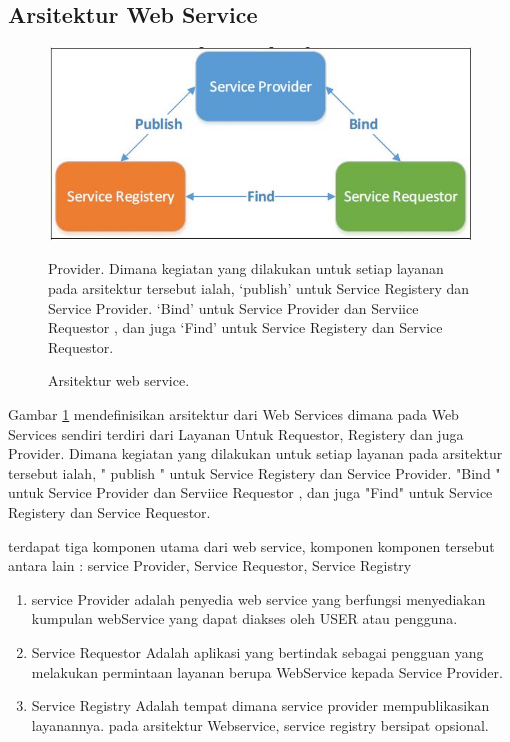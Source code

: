 \subsection{Arsitektur Web Service}
\begin{figure}[ht]
\centerline{\includegraphics[width=1\textwidth]{figures/1arsitektur.JPG}}

\caption{Arsitektur web service.} 
\label{1arsitektur}
 Provider. Dimana kegiatan yang dilakukan untuk setiap layanan pada arsitektur tersebut ialah, `publish' untuk Service Registery dan Service Provider. `Bind' untuk Service Provider dan Serviice Requestor , dan juga `Find' untuk Service Registery dan Service Requestor.

\end{figure}
Gambar \ref{1arsitektur} mendefinisikan arsitektur dari Web Services dimana pada Web Services sendiri terdiri dari Layanan Untuk Requestor, Registery dan juga Provider. Dimana kegiatan yang dilakukan untuk setiap layanan pada arsitektur tersebut ialah, " publish " untuk Service Registery dan Service Provider. "Bind " untuk Service Provider dan Serviice Requestor , dan juga "Find" untuk Service Registery dan Service Requestor.

terdapat tiga komponen utama dari web service, komponen komponen tersebut antara lain :
service Provider, Service Requestor, Service Registry 

\begin{enumerate}
\item service Provider adalah penyedia web service yang berfungsi menyediakan kumpulan webService yang dapat diakses oleh USER atau pengguna.
\item Service Requestor Adalah aplikasi yang bertindak sebagai pengguan yang melakukan permintaan layanan berupa WebService kepada Service Provider.
\item Service Registry Adalah tempat dimana service provider mempublikasikan layanannya. pada arsitektur Webservice, service registry bersipat opsional\cite{kurniawan2015implementasi}.
\end{enumerate}

